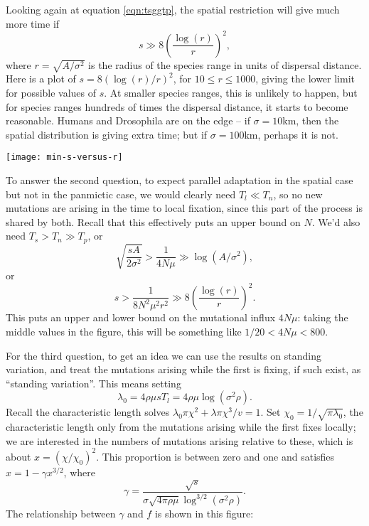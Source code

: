 \documentclass{article}
\begin{document}
Looking again at equation \eqref{eqn:tsggtp},
the spatial restriction will give much more time if
\[
  s \gg 8 \left( \frac{\log(r)}{r} \right)^2,
\]
where $r=\sqrt{A/\sigma^2}$ is the radius of the species range in units of dispersal distance.
Here is a plot of $s = 8 \left( \log(r)/r \right)^2$,
for $10 \le r \le 1000$, giving the lower limit for possible values of $s$.
At smaller species ranges, this is unlikely to happen, 
but for species ranges hundreds of times the dispersal distance, it starts to become reasonable.
Humans and Drosophila are on the edge -- if $\sigma=10$km,
then the spatial distribution is giving extra time; 
but if $\sigma=100$km, perhaps it is not.

  \texttt{[image: min-s-versus-r]}

To answer the second question, 
to expect parallel adaptation in the spatial case but not in the panmictic case,
we would clearly need $T_l \ll T_n$, so no new mutations are arising in the time to local fixation,
since this part of the process is shared by both.
Recall that this effectively puts an upper bound on $N$.
We'd also need
$T_s > T_n \gg T_p$,
or
\begin{equation}
  \sqrt{\frac{sA}{2\sigma^2}} > \frac{1}{4N\mu} \gg \log(A/\sigma^2) ,
\end{equation}
or
\begin{equation}
  s > \frac{1}{8 N^2 \mu^2 r^2} \gg 8 \left(\frac{ \log(r) }{ r }\right)^2 .
\end{equation}
This puts an upper and lower bound on the mutational influx $4N\mu$:
taking the middle values in the figure, 
this will be something like $1/20 < 4N\mu < 800$.

For the third question,
to get an idea we can use the results on standing variation,
and treat the mutations arising while the first is fixing, if such exist, as ``standing variation''.
This means setting 
\[
  \lambda_0 = 4 \rho \mu s T_l = 4 \rho \mu \log(\sigma^2 \rho) .
\]
Recall the characteristic length solves $\lambda_0 \pi \chi^2 + \lambda \pi \chi^3/v = 1$.
Set $\chi_0 = 1/\sqrt{\pi \lambda_0}$, 
the characteristic length only from the mutations arising while the first fixes locally;
we are interested in the numbers of mutations arising relative to these,
which is about $x=(\chi/\chi_0)^2$.
This proportion is between zero and one and satisfies
$x = 1-\gamma x^{3/2}$, 
where 
\[
  \gamma = \frac{ \sqrt{s} }{ \sigma \sqrt{4 \pi \rho \mu} \log^{3/2}(\sigma^2 \rho) } .
\]
The relationship between $\gamma$ and $f$ is shown in this figure:
\end{document}
